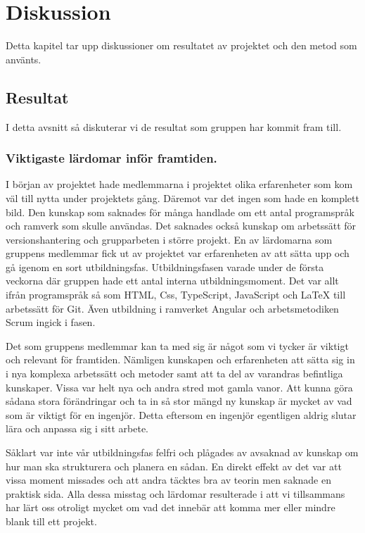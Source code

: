 \chapter{Diskussion}
Detta kapitel tar upp diskussioner om resultatet av projektet och den metod som använts.
\section{Resultat}
I detta avsnitt så diskuterar vi de resultat som gruppen har kommit fram till.

\subsection{Viktigaste lärdomar inför framtiden.}
I början av projektet hade medlemmarna i projektet olika erfarenheter som kom väl till nytta under projektets gång. Däremot var det ingen som hade en komplett bild. Den kunskap som saknades för många handlade om ett antal programspråk och ramverk som skulle användas. Det saknades också kunskap om arbetssätt för versionshantering och grupparbeten i större projekt. En av lärdomarna som gruppens medlemmar fick ut av projektet var erfarenheten av att sätta upp och gå igenom en sort utbildningsfas. Utbildningsfasen varade under de första veckorna där gruppen hade ett antal interna utbildningsmoment. Det var allt ifrån programspråk så som HTML, Css, TypeScript, JavaScript och LaTeX till arbetssätt för Git. Även utbildning i ramverket Angular och arbetsmetodiken Scrum ingick i fasen.

Det som gruppens medlemmar kan ta med sig är något som vi tycker är viktigt och relevant för framtiden. Nämligen kunskapen och erfarenheten att sätta sig in i nya komplexa arbetssätt och metoder samt att ta del av varandras befintliga kunskaper. Vissa var helt nya och andra stred mot gamla vanor. Att kunna göra sådana stora förändringar och ta in så stor mängd ny kunskap är mycket av vad som är viktigt för en ingenjör. Detta eftersom en ingenjör egentligen aldrig slutar lära och anpassa sig i sitt arbete.

Såklart var inte vår utbildningsfas felfri och plågades av avsaknad av kunskap om hur man ska strukturera och planera en sådan. En direkt effekt av det var att vissa moment missades och att andra täcktes bra av teorin men saknade en praktisk sida. Alla dessa misstag och lärdomar resulterade i att vi tillsammans har lärt oss otroligt mycket om vad det innebär att komma mer eller mindre blank till ett projekt.

